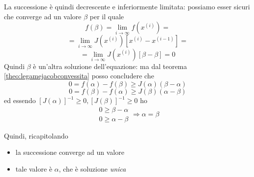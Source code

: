 \begin{thproof}
La successione \`e  quindi decrescente e inferiormente limitata: possiamo esser sicuri che converge ad un valore $ \beta $ per il quale
\[ f(\beta) = \lim_{i \rightarrow \infty} f(x^{(i)}) = \]
\[ = \lim_{i \rightarrow \infty} J(x^{(i)})\left[ x^{(i)} - x^{(i-1)} \right] = \]
\[ = \lim_{i \rightarrow \infty} J(x^{(i)})\left[ \beta - \beta \right] = 0 \]
Quindi $ \beta $ \`e  un'altra soluzione dell'equazione: ma dal teorema \ref{theo:legamejacobconvessita} posso concludere che
\[ 0 = f(\alpha) - f(\beta) \geq J(\alpha)(\beta - \alpha) \]
\[ 0 = f(\beta) - f(\alpha) \geq J(\beta)(\alpha - \beta) \]
ed essendo $ [J(\alpha)]^{-1} \geq 0, [J(\beta)]^{-1} \geq 0 $ ho
\[ \left. \begin{array}{c}
0 \geq \beta - \alpha \\ 
0 \geq \alpha - \beta
\end{array}  \right. \Rightarrow \alpha = \beta \]

Quindi, ricapitolando
\begin{itemize}
\item la successione converge ad un valore
\item tale valore \`e  $\alpha$, che \`e  soluzione \emph{unica}
\end{itemize}
\end{thproof}

\outbpdocument
